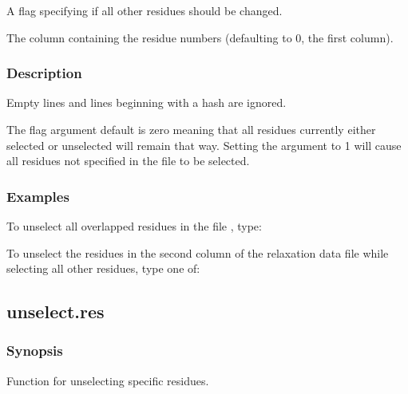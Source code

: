    A flag specifying if all other residues should be changed.   

   The column containing the residue numbers (defaulting to 0, the first column).  

  

  
 \subsubsection{Description} 

 Empty lines and lines beginning with a hash are ignored. 
  

 The  flag argument default is zero meaning that all residues currently either selected or unselected will remain that way.  Setting the argument to 1 will cause all residues not specified in the file to be selected. 
  

  
 \subsubsection{Examples} 

 To unselect all overlapped residues in the file , type: 
  



 To unselect the residues in the second column of the relaxation data file  while selecting all other residues, type one of:  
  



  

 \newpage 

 \subsection{unselect.res} 

  
 \subsubsection{Synopsis} 

 Function for unselecting specific residues. 
  

